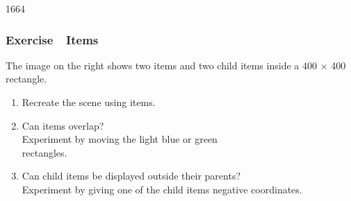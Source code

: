 \begin{slide}{1664}\frametitle{Exercise~\textendash~Items}


The image on the right shows two items and two child items inside
a 400 $\times$ 400 rectangle.\\

\begin{enumerate}
\item Recreate the scene using  items.
\item Can items overlap?\\
{\small Experiment by moving the light blue or green\\
rectangles.}
\item Can child items be displayed outside their parents?\\
{\small Experiment by giving one of the child items negative coordinates.}
\end{enumerate}

\end{slide}
